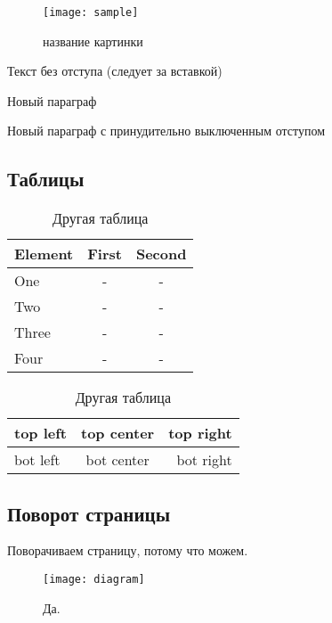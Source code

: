 \begin{figure}[H]
	\begin{center}
		\texttt{[image: sample]}
		\caption{название картинки} 
		\label{pic:pic_name} %
	\end{center}
\end{figure}

Текст без отступа (следует за вставкой)

Новый параграф

\noindent Новый параграф с принудительно выключенным отступом


\subsection{Таблицы}

\begin{table}[H]
	\caption{Одна таблица}
	\begin{center}
        \begin{tabular*}{0.4\textwidth}{@{\extracolsep{\fill} } lcc}
            \toprule
            Element & First & Second \\
            \midrule
            One       & -    & -    \\
            Two       & -    & -    \\
            Three     & -    & -    \\
            Four      & -    & -    \\
            \bottomrule
        \end{tabular*}
        \label{tabular:tab_examp_1}
    \end{center}
    
    \caption{Другая таблица}
	\begin{center}
		\begin{tabular}{|l|c|r|}
			\hline
			top left & top center & top right\\ \hline
			bot left & bot center & bot right\\ \hline
		\end{tabular}
		\label{tabular:tab_examp_2}
	\end{center}
\end{table}

\begin{landscape}
\subsection{Поворот страницы}
Поворачиваем страницу, потому что можем.
\begin{figure}[H]
    \centering
    \texttt{[image: diagram]}
    \caption{Да.}
\end{figure}
\end{landscape}

